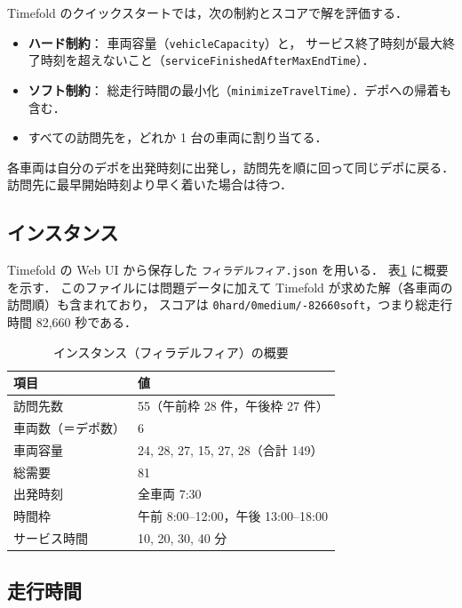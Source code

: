 \documentclass[11pt,a4paper]{ltjsarticle}
\begin{document}
Timefold のクイックスタートでは，次の制約とスコアで解を評価する．
\begin{itemize}
  \item \textbf{ハード制約}：
    車両容量（\texttt{vehicleCapacity}）と，
    サービス終了時刻が最大終了時刻を超えないこと（\texttt{serviceFinishedAfterMaxEndTime}）．
  \item \textbf{ソフト制約}：
    総走行時間の最小化（\texttt{minimizeTravelTime}）．デポへの帰着も含む．
  \item すべての訪問先を，どれか 1 台の車両に割り当てる．
\end{itemize}
各車両は自分のデポを出発時刻に出発し，訪問先を順に回って同じデポに戻る．
訪問先に最早開始時刻より早く着いた場合は待つ．

\subsection{インスタンス}

Timefold の Web UI から保存した \texttt{フィラデルフィア.json} を用いる．
表\ref{tab:instance} に概要を示す．
このファイルには問題データに加えて Timefold が求めた解（各車両の訪問順）も含まれており，
スコアは \texttt{0hard/0medium/-82660soft}，つまり総走行時間 82,660 秒である．

\begin{table}[htbp]
  \centering
  \caption{インスタンス（フィラデルフィア）の概要}
  \label{tab:instance}
  \begin{tabular}{ll}
    \toprule
    項目 & 値 \\
    \midrule
    訪問先数 & 55（午前枠 28 件，午後枠 27 件） \\
    車両数（＝デポ数） & 6 \\
    車両容量 & 24, 28, 27, 15, 27, 28（合計 149） \\
    総需要 & 81 \\
    出発時刻 & 全車両 7:30 \\
    時間枠 & 午前 8:00--12:00，午後 13:00--18:00 \\
    サービス時間 & 10, 20, 30, 40 分 \\
    \bottomrule
  \end{tabular}
\end{table}

\subsection{走行時間}
\end{document}

